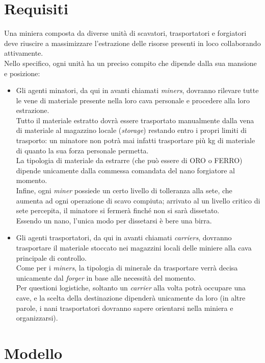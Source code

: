 \documentclass{llncs}
\newcommand{\labelsec}[1]{\label{sec:#1}}
\begin{document}
\section{Requisiti}
Una miniera composta da diverse unità di scavatori, trasportatori e forgiatori deve riuscire a massimizzare l'estrazione delle risorse presenti in loco collaborando attivamente.\\
Nello specifico, ogni unità ha un preciso compito che dipende dalla sua mansione e posizione:
\begin{itemize}
\item Gli agenti minatori, da qui in avanti chiamati \textit{miners}, dovranno rilevare tutte le vene di materiale presente nella loro cava personale e procedere alla loro estrazione.\\
Tutto il materiale estratto dovrà essere trasportato manualmente dalla vena di materiale al magazzino locale (\textit{storage}) restando entro i propri limiti di trasporto: un minatore non potrà mai infatti trasportare più kg di materiale di quanto la sua forza personale permetta.\\
La tipologia di materiale da estrarre (che può essere di ORO o FERRO) dipende unicamente dalla commessa comandata del nano forgiatore al momento.\\Infine, ogni \textit{miner} possiede un certo livello di tolleranza alla sete, che aumenta ad ogni operazione di scavo compiuta; arrivato al un livello critico di sete percepita, il minatore si fermerà finché non si sarà dissetato.\\
Essendo un nano, l'unica modo per dissetarsi è bere una birra.\\
\item Gli agenti trasportatori, da qui in avanti chiamati \textit{carriers}, dovranno trasportare il materiale stoccato nei magazzini locali delle miniere alla cava principale di controllo.\\Come per i \textit{miners}, la tipologia di minerale da trasportare verrà decisa unicamente dal \textit{forger} in base alle necessità del momento.\\
Per questioni logistiche, soltanto un \textit{carrier} alla volta potrà occupare una cave, e la scelta della destinazione dipenderà unicamente da loro (in altre parole, i nani trasportatori dovranno sapere orientarsi nella miniera e organizzarsi).\\
\end{itemize}
\newpage
\section{Modello}
\labelsec{Modello}
\end{document}
